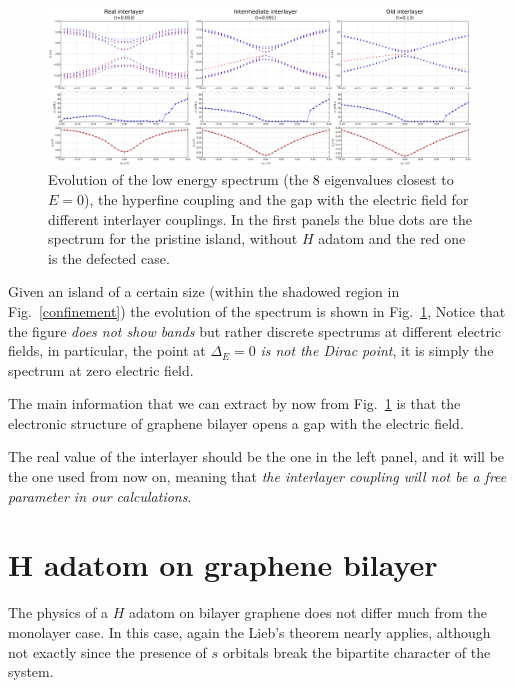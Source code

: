 \begin{figure}[h!]
  \centering
  \includegraphics[width=\textwidth]{defects/fig/interlayer_elec.pdf}
  \vspace{-5pt}
\caption{Evolution of the low energy spectrum (the 8 eigenvalues closest to $E=0$), the hyperfine coupling and the gap with the electric field for different interlayer couplings. In the first panels the blue dots are the spectrum for the pristine island, without $H$ adatom and the red one is the defected case.}
\label{spectrums}
\end{figure}
\FloatBarrier

Given an island of a certain size (within the shadowed region in Fig.~\ref{confinement}) the evolution of the spectrum is shown in Fig.~\ref{spectrums}, Notice that the figure \emph{does not show bands} but rather discrete spectrums at different electric fields, in particular, the point at $\Delta_E=0$ \emph{is not the Dirac point}, it is simply the spectrum at zero electric field.

The main information that we can extract by now from Fig.~\ref{spectrums} is that the electronic structure of graphene bilayer opens a gap with the electric field.

The real value of the interlayer should be the one in the left panel, and it will be the one used from now on, meaning that \emph{the interlayer coupling will not be a free parameter in our calculations}.


\section{H adatom on graphene bilayer}

The physics of a $H$ adatom on bilayer graphene does not differ much from the monolayer case. In this case, again the Lieb's theorem nearly applies, although not exactly since the presence of $s$ orbitals break the bipartite character of the system.

